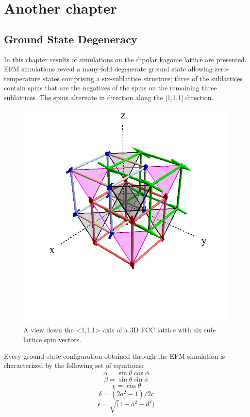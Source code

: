 \chapter{Another chapter}\label{ch:results}

\section{Ground State Degeneracy}
In this chapter results of simulations on the dipolar kagome lattice are presented. EFM simulations reveal a many-fold degenerate ground state allowing zero-temperature states comprising a six-sublattice structure; three of the sublattices contain spins that are the negatives of the spins on the remaining three sublattices. The spins alternate in direction along the [1,1,1] direction.

\begin{figure}
	\includegraphics[width=\linewidth]{img/3dfcc.png}
	\caption{A view down the <1,1,1> axis of a 3D FCC lattice with six sub-lattice spin vectors.}
	\label{fig:3dfcc}
\end{figure}

\clearpage
Every ground state configuration obtained through the EFM simulation is characterized by the following set of equations:
\begin{equation}
\label{eqn:rel_a}
\alpha = \sin{\theta} \cos{\phi}
\end{equation}
\begin{equation}
\label{eqn:rel_b}
\beta = \sin{\theta} \sin{\phi}
\end{equation}
\begin{equation}
\label{eqn:rel_c}
\chi = \cos{\theta}
\end{equation}
\begin{equation}
\label{eqn:rel_d}
\delta = (2a^2-1)/2c
\end{equation}
\begin{equation}
\label{eqn:rel_e}
\epsilon = \sqrt(1-a^2-d^2)
\end{equation}

